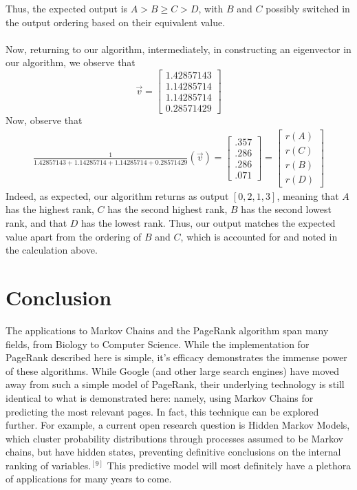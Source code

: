 \documentclass{article}
\begin{document}
    Thus, the expected output is $A > B \geq C > D$, with $B$ and $C$ possibly switched in the output ordering based on their equivalent value.
    \\\\
    \noindent
    Now, returning to our algorithm, intermediately, in constructing an eigenvector in our algorithm, we observe that $$\vec{v}  = \begin{bmatrix} 1.42857143 \\ 1.14285714 \\ 1.14285714 \\ 0.28571429 \end{bmatrix}$$
    \noindent
    Now, observe that 
    \begin{align*}
        \frac{1}{1.42857143 + 1.14285714 + 1.14285714 + 0.28571429}(\vec{v}) = \begin{bmatrix} .357 \\ .286 \\ .286 \\.071 \end{bmatrix} = \begin{bmatrix} r(A) \\ r(C) \\ r(B) \\ r(D) \end{bmatrix}
    \end{align*}
    \noindent
    Indeed, as expected, our algorithm returns as output $[0, 2, 1, 3]$, meaning that $A$ has the highest rank, $C$ has the second highest rank, $B$ has the second lowest rank, and that $D$ has the lowest rank. Thus, our output matches the expected value apart from the ordering of $B$ and $C$, which is accounted for and noted in the calculation above.


\section{Conclusion}
The applications to Markov Chains and the PageRank algorithm span many fields, from Biology to Computer Science. While the implementation for PageRank described here is simple, it's efficacy demonstrates the immense power of these algorithms. While Google (and other large search engines) have moved away from such a simple model of PageRank, their underlying technology is still identical to what is demonstrated here: namely, using Markov Chains for predicting the most relevant pages. In fact, this technique can be explored further. For example, a current open research question is Hidden Markov Models, which cluster probability distributions through processes assumed to be Markov chains, but have hidden states, preventing definitive conclusions on the internal ranking of variables.$^{[9]}$ This predictive model will most definitely have a plethora of applications for many years to come.
\end{document}
